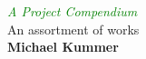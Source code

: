 \documentclass[../resume.tex]{subfiles}
\begin{document}
\begin{titlepage} 

	\centering 
	\textcolor{Green}{\textit{\Huge A Project Compendium}}\\[\baselineskip]
	{\color{RosyBrown}\Large An assortment of works}\\
	\vfill 
	{\Large\textbf{Michael Kummer}}\\
	\vfill 
\end{titlepage}
\end{document}
